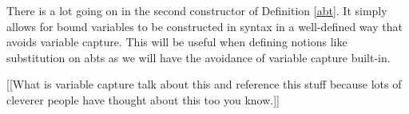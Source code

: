 \begin{remark}
    There is a lot going on in the second constructor of Definition \ref{abt}. It simply allows for bound variables to be constructed in syntax in a well-defined way that avoids variable capture. This will be useful when defining notions like substitution on abts as we will have the avoidance of variable capture built-in.
\end{remark}

[[What is variable capture talk about this and reference this stuff because lots of cleverer people have thought about this too you know.]]


